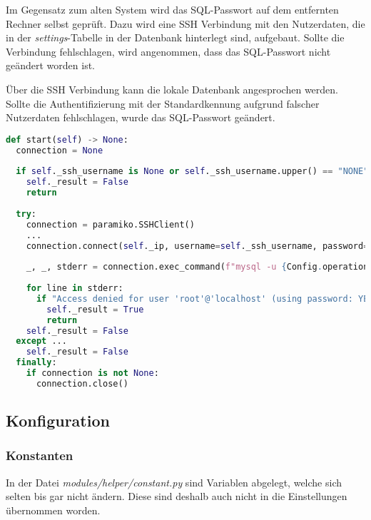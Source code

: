 Im Gegensatz zum alten System wird das SQL-Passwort auf dem entfernten Rechner selbst geprüft.
Dazu wird eine SSH Verbindung mit den Nutzerdaten, die in der \textit{settings}-Tabelle in der Datenbank hinterlegt sind, aufgebaut. Sollte die Verbindung fehlschlagen, wird angenommen, dass das SQL-Passwort nicht geändert worden ist.

Über die SSH Verbindung kann die lokale Datenbank angesprochen werden. Sollte die Authentifizierung mit der Standardkennung aufgrund falscher Nutzerdaten fehlschlagen, wurde das SQL-Passwort geändert.

\begin{lstlisting}[language=Python, frame=single, caption={Big Brother SQL-Passwort}, captionpos=b, label={lst:bigbrother-sql-password}]
def start(self) -> None:
  connection = None
  
  if self._ssh_username is None or self._ssh_username.upper() == "NONE" or self._ssh_password is None or self._ssh_password.upper() == "NONE":
    self._result = False
    return
  
  try:
    connection = paramiko.SSHClient()
    ...
    connection.connect(self._ip, username=self._ssh_username, password=self._ssh_password, timeout=Config.operations['base']['ssh_timeout'])
    
    _, _, stderr = connection.exec_command(f"mysql -u {Config.operations['sql']['username']} -p{Config.operations['sql']['password']} -e 'quit'")
    
    for line in stderr:
      if "Access denied for user 'root'@'localhost' (using password: YES)" in line.strip('\n'):
        self._result = True
        return
    self._result = False
  except ...
    self._result = False
  finally:
    if connection is not None:
      connection.close()
\end{lstlisting}

\subsection{Konfiguration}

\subsubsection{Konstanten}

In der Datei \textit{modules/helper/constant.py} sind Variablen abgelegt, welche sich selten bis gar nicht ändern. Diese sind deshalb auch nicht in die Einstellungen übernommen worden.

